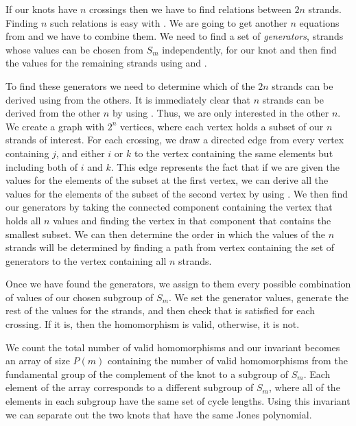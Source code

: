 \begin{paper}
If our knots have $n$ crossings then we have to find relations between $2n$ strands.
Finding $n$ such relations is easy with \eqUpper.
We are going to get another $n$ equations from \eqBoth and we have to combine them.
We need to find a set of \textit{generators}, strands whose values can be chosen
from $S_m$ independently, for our knot and then find the values for the
remaining strands using \eqUpper and \eqBoth.

To find these generators we need to determine which of the $2n$ strands can be
derived using \eqBoth from the others.
It is immediately clear that $n$ strands can be derived from the other $n$ by
using \eqUpper.
Thus, we are only interested in the other $n$.
We create a graph with $2^n$ vertices, where each vertex holds a subset of our
$n$ strands of interest.
For each crossing, we draw a directed edge from every vertex containing $j$, and
either $i$ or $k$ to the vertex containing the same elements but including both
of $i$ and $k$.
This edge represents the fact that if we are given the values for the elements
of the subset at the first vertex, we can derive all the values for the elements
of the subset of the second vertex by using \eqBoth.
We then find our generators by taking the connected component containing the
vertex that holds all $n$ values and finding the vertex in that component that
contains the smallest subset.
We can then determine the order in which the values of the $n$ strands will be
determined by finding a path from vertex containing the set of generators to the
vertex containing all $n$ strands.


Once we have found the generators, we assign to them every possible
combination of values of our chosen subgroup of $S_m$.
We set the generator values, generate the rest of the values for the strands,
and then check that \eqBoth is satisfied for each crossing.
If it is, then the homomorphism is valid, otherwise, it is not.


We count the total number of valid homomorphisms and our invariant becomes an
array of size $P(m)$ containing the number of valid homomorphisms from the
fundamental group of the complement of the knot to a subgroup of $S_m$.
Each element of the array corresponds to a different subgroup of $S_m$, where
all of the elements in each subgroup have the same set of cycle lengths.
Using this invariant we can separate out the two knots that have the same Jones
polynomial.


\end{paper}
